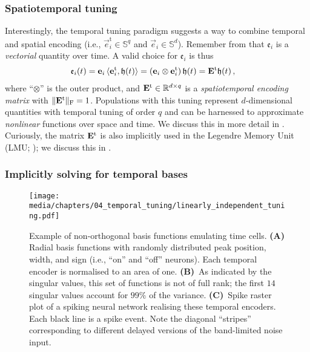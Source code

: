 \subsubsection{Spatiotemporal tuning}
Interestingly, the temporal tuning paradigm suggests a way to combine temporal and spatial encoding (i.e., $\vec{e}_i^\mathrm{t} \in \mathbb{S}^q$ and $\vec{e}_i \in \mathbb{S}^d$).
Remember from  that $\mathfrak{e}_i$ is a \emph{vectorial} quantity over time.
A valid choice for  $\mathfrak{e}_i$ is thus
\begin{align}
	\mathfrak{e}_i(t) &= \mathbf{e}_i \, \langle \mathbf{e}_i^\mathrm{t}, \mathbf{\mathfrak{h}}(t) \rangle = (\mathbf{e}_i \otimes \mathbf{e}_i^\mathrm{t}) \, \mathfrak{h}(t) = \mathbf{E}^\mathrm{t} \mathfrak{h}(t)\,,
	\label{eqn:spatio_temporal_encoding_vector}
\end{align}
where \enquote{$\otimes$} is the outer product, and $\mathbf{E}^\mathrm{t} \in \mathbb{R}^{d \times q}$ is a \emph{spatiotemporal encoding matrix} with $\| \mathbf{E}^\mathrm{t} \|_\mathrm{F} = 1$.
Populations with this tuning represent $d$-dimensional quantities with temporal tuning of order $q$ and can be harnessed to approximate \emph{nonlinear} functions over space and time.
We discuss this in more detail in .
Curiously, the matrix $\mathbf{E}^\mathrm{t}$ is also implicitly used in the Legendre Memory Unit (LMU; \cite{voelker2019lmu}); we discuss this in .

\subsubsection{Implicitly solving for temporal bases}

\begin{figure}
	\centering
	\texttt{[image: media/chapters/04\_temporal\_tuning/linearly\_independent\_tuning.pdf]}%
	{\label{fig:linearly_independent_tuning_a}}%
	{\label{fig:linearly_independent_tuning_b}}%
	{\label{fig:linearly_independent_tuning_c}}%
	\caption[Example of non-orthogonal basis functions emulating time cells]{Example of non-orthogonal basis functions emulating time cells.
	\textbf{(A)} Radial basis functions with randomly distributed peak position, width, and sign (i.e., \enquote{on} and \enquote{off} neurons).
	Each temporal encoder is normalised to an area of one.
\textbf{(B)}~As indicated by the singular values, this set of functions is not of full rank; the first $14$ singular values account for $99\%$ of the variance.
\textbf{(C)}~Spike raster plot of a spiking neural network realising these temporal encoders. Each black line is a spike event. Note the diagonal \enquote{stripes} corresponding to different delayed versions of the band-limited noise input.
}
	\label{fig:linearly_independent_tuning}
\end{figure}


